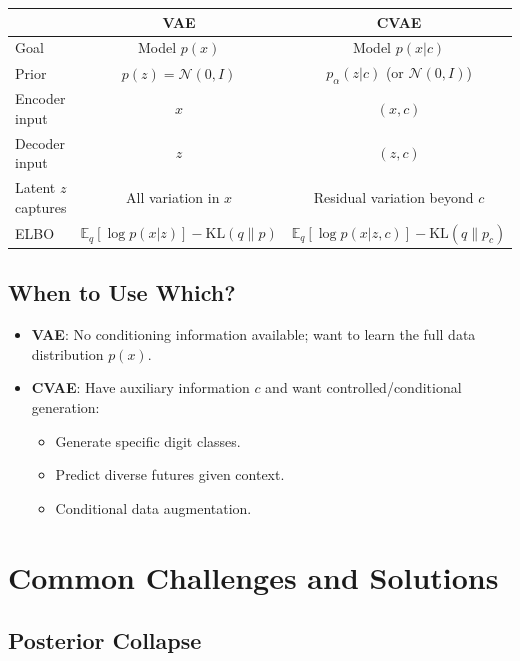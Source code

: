 \documentclass{article}
\begin{document}
\begin{center}
\renewcommand{\arraystretch}{1.5}
\begin{tabular}{lcc}
\toprule
& \textbf{VAE} & \textbf{CVAE} \\
\midrule
Goal & Model $p(x)$ & Model $p(x|c)$ \\
Prior & $p(z) = \mathcal{N}(0,I)$ & $p_\alpha(z|c)$ (or $\mathcal{N}(0,I)$) \\
Encoder input & $x$ & $(x, c)$ \\
Decoder input & $z$ & $(z, c)$ \\
Latent $z$ captures & All variation in $x$ & Residual variation beyond $c$ \\
\midrule
ELBO & $\mathbb{E}_{q}[\log p(x|z)] - \mathrm{KL}(q\|p)$ & $\mathbb{E}_{q}[\log p(x|z,c)] - \mathrm{KL}(q\|p_c)$ \\
\bottomrule
\end{tabular}
\end{center}

\subsection{When to Use Which?}

\begin{itemize}
    \item \textbf{VAE}: No conditioning information available; want to learn the full data distribution $p(x)$.
    \item \textbf{CVAE}: Have auxiliary information $c$ and want controlled/conditional generation:
    \begin{itemize}
        \item Generate specific digit classes.
        \item Predict diverse futures given context.
        \item Conditional data augmentation.
    \end{itemize}
\end{itemize}

\section{Common Challenges and Solutions}

\subsection{Posterior Collapse}
\end{document}
